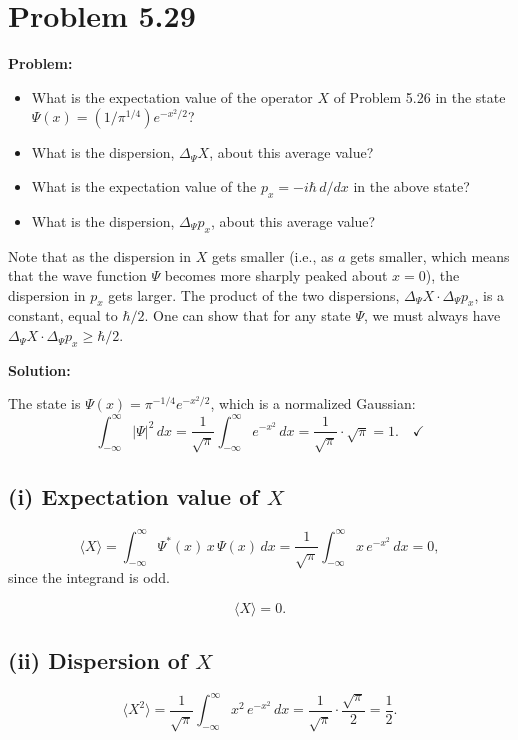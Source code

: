 \documentclass[12pt]{article}
\begin{document}
\section*{Problem 5.29}

\textbf{Problem:}
\begin{itemize}
\item[(i)] What is the expectation value of the operator $X$ of Problem 5.26 in the state $\Psi(x) = (1/\pi^{1/4})e^{-x^2/2}$?
\item[(ii)] What is the dispersion, $\Delta_\Psi X$, about this average value?
\item[(iii)] What is the expectation value of the $p_x = -i\hbar\,d/dx$ in the above state?
\item[(iv)] What is the dispersion, $\Delta_\Psi p_x$, about this average value?
\end{itemize}

Note that as the dispersion in $X$ gets smaller (i.e., as $a$ gets smaller, which means that the wave function $\Psi$ becomes more sharply peaked about $x = 0$), the dispersion in $p_x$ gets larger. The product of the two dispersions, $\Delta_\Psi X \cdot \Delta_\Psi p_x$, is a constant, equal to $\hbar/2$. One can show that for any state $\Psi$, we must always have $\Delta_\Psi X \cdot \Delta_\Psi p_x \geq \hbar/2$.

\bigskip
\textbf{Solution:}

The state is $\Psi(x) = \pi^{-1/4}e^{-x^2/2}$, which is a normalized Gaussian:
\[
\int_{-\infty}^{\infty}|\Psi|^2\,dx = \frac{1}{\sqrt{\pi}}\int_{-\infty}^{\infty}e^{-x^2}\,dx = \frac{1}{\sqrt{\pi}}\cdot\sqrt{\pi} = 1. \quad\checkmark
\]

\subsection*{(i) Expectation value of $X$}

\[
\langle X\rangle = \int_{-\infty}^{\infty}\Psi^*(x)\,x\,\Psi(x)\,dx = \frac{1}{\sqrt{\pi}}\int_{-\infty}^{\infty}x\,e^{-x^2}\,dx = 0,
\]
since the integrand is odd.

\[
\boxed{\langle X\rangle = 0.}
\]

\subsection*{(ii) Dispersion of $X$}

\[
\langle X^2\rangle = \frac{1}{\sqrt{\pi}}\int_{-\infty}^{\infty}x^2\,e^{-x^2}\,dx = \frac{1}{\sqrt{\pi}}\cdot\frac{\sqrt{\pi}}{2} = \frac{1}{2}.
\]
\end{document}
